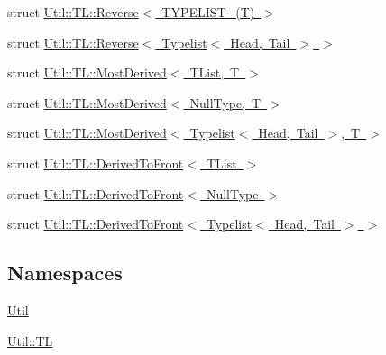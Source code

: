 \begin{DoxyCompactItemize}
\item 
struct \mbox{\hyperlink{structUtil_1_1TL_1_1Reverse_3_01TYPELIST__1_07T_08_01_4}{Util\+::\+T\+L\+::\+Reverse$<$ T\+Y\+P\+E\+L\+I\+S\+T\+\_(\+T) $>$}}
\item 
struct \mbox{\hyperlink{structUtil_1_1TL_1_1Reverse_3_01Typelist_3_01Head_00_01Tail_01_4_01_4}{Util\+::\+T\+L\+::\+Reverse$<$ Typelist$<$ Head, Tail $>$ $>$}}
\item 
struct \mbox{\hyperlink{structUtil_1_1TL_1_1MostDerived}{Util\+::\+T\+L\+::\+Most\+Derived$<$ T\+List, T $>$}}
\item 
struct \mbox{\hyperlink{structUtil_1_1TL_1_1MostDerived_3_01NullType_00_01T_01_4}{Util\+::\+T\+L\+::\+Most\+Derived$<$ Null\+Type, T $>$}}
\item 
struct \mbox{\hyperlink{structUtil_1_1TL_1_1MostDerived_3_01Typelist_3_01Head_00_01Tail_01_4_00_01T_01_4}{Util\+::\+T\+L\+::\+Most\+Derived$<$ Typelist$<$ Head, Tail $>$, T $>$}}
\item 
struct \mbox{\hyperlink{structUtil_1_1TL_1_1DerivedToFront}{Util\+::\+T\+L\+::\+Derived\+To\+Front$<$ T\+List $>$}}
\item 
struct \mbox{\hyperlink{structUtil_1_1TL_1_1DerivedToFront_3_01NullType_01_4}{Util\+::\+T\+L\+::\+Derived\+To\+Front$<$ Null\+Type $>$}}
\item 
struct \mbox{\hyperlink{structUtil_1_1TL_1_1DerivedToFront_3_01Typelist_3_01Head_00_01Tail_01_4_01_4}{Util\+::\+T\+L\+::\+Derived\+To\+Front$<$ Typelist$<$ Head, Tail $>$ $>$}}
\end{DoxyCompactItemize}
\subsection*{Namespaces}
\begin{DoxyCompactItemize}
\item 
 \mbox{\hyperlink{namespaceUtil}{Util}}
\item 
 \mbox{\hyperlink{namespaceUtil_1_1TL}{Util\+::\+TL}}
\end{DoxyCompactItemize}
